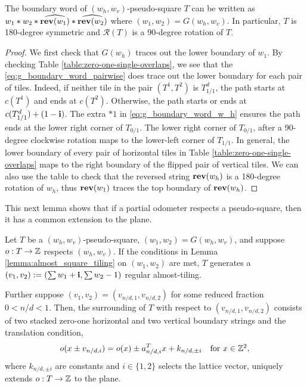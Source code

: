\documentclass[12pt]{amsart}
\begin{document}
\begin{lemma}
The boundary word of $(w_h,w_v)$-pseudo-square $T$ can be written as $w_1*w_2*\widehat{\mathop{\bf rev}(w_1)}*\widehat{\mathop{\bf rev}(w_2)}$ where
$(w_1,w_2) = G(w_h, w_v)$. In particular, $T$ is 180-degree symmetric and $\mathcal{R}(T)$ is a 90-degree rotation of $T$.
\end{lemma} \label{lemma:pseudo-square-boundary-word}
\begin{proof}
	We first check that $G(w_h)$ traces out the lower boundary of $w_1$. By checking Table \ref{table:zero-one-single-overlaps}, 
	we see that the \eqref{eq:g_boundary_word_pairwise} does trace out the lower boundary for each pair of tiles. Indeed, 
	if neither tile in the pair $(T^1, T^2)$ is $T_{1/1}^d$, the path starts at $c(T^1)$ and ends at $c(T^2)$. Otherwise, the path 
	starts or ends at $c(T_{1/1}^d) + (1 - \mathbf{i})$. The extra $*1$ in \eqref{eq:g_boundary_word_w_h} ensures 
	the path ends at the lower right corner of $T_{0/1}$. The lower right corner of $T_{0/1}$, after a 90-degree clockwise rotation 
	maps to the lower-left corner of $T_{1/1}$. In general, the lower boundary of every pair of horizontal tiles in Table \ref{table:zero-one-single-overlaps} maps to the right boundary of the flipped pair of vertical tiles. We can also use the table to check that the reversed string $\mathop{\bf rev}(w_h)$ is a 180-degree rotation of $w_h$, thus $\mathop{\bf rev}(w_1)$ traces the top boundary of $\mathop{\bf rev}(w_h)$.  
\end{proof}



This next lemma shows that if a partial odometer respects a pseudo-square, then it has a common 
extension to the plane. 

\begin{lemma}
Let $T$ be a $(w_h,w_v)$-pseudo-square,  $(w_1,w_2) = G(w_h, w_v)$, and suppose $o: T \to \mathbb{Z}$ respects $(w_h, w_v)$. If the conditions in Lemma \ref{lemma:almost_square_tiling} on $(w_1,w_2)$ are met, $T$ generates a $(v_1, v_2) := (\sum w_1 + \mathbf{i}, \sum w_2 - 1)$ regular almost-tiling.

Further suppose $(v_{1}, v_2) = (v_{n/d, 1}, v_{n/d,2})$ for some reduced fraction $0 < n/d < 1$. Then, the surrounding of $T$ with respect to $(v_{n/d, 1}, v_{n/d, 2})$ consists of two stacked zero-one horizontal and two vertical boundary strings and the translation condition,
\begin{equation} \label{eq:translation_condition}
o(x \pm v_{n/d,i}) = o(x) \pm a_{n/d,i}^T x + k_{n/d, \pm i}  \quad \mbox{for $x \in \mathbb{Z}^2$},
\end{equation}
where $k_{n/d, \pm i}$ are constants and $i \in \{1,2\}$ selects the lattice vector, uniquely extends $o:T \to \mathbb{Z}$ to the plane. 
\end{lemma} \label{lemma:common-extension-pseudo-square}
\end{document}
